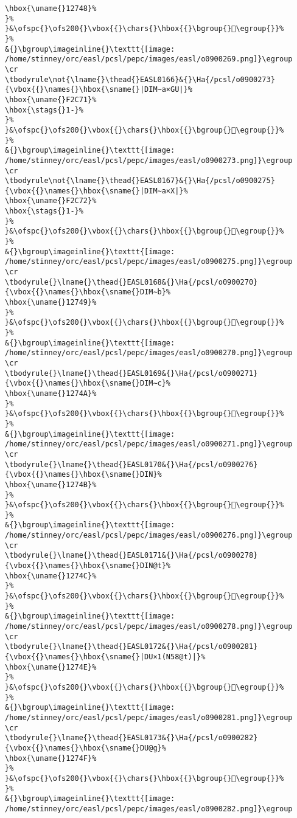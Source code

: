 \begin{verbatim}
\hbox{\uname{}12748}%
}%
}&\ofspc{}\ofs200{}\vbox{{}\chars{}\hbox{{}\bgroup{}𒝈\egroup{}}%
}%
&{}\bgroup\imageinline{}\texttt{[image: /home/stinney/orc/easl/pcsl/pepc/images/easl/o0900269.png]}\egroup
\cr
\tbodyrule\not{\lname{}\thead{}EASL0166}&{}\Ha{/pcsl/o0900273}{\vbox{{}\names{}\hbox{\sname{}|DIM∼a×GU|}%
\hbox{\uname{}F2C71}%
\hbox{\stags{}1-}%
}%
}&\ofspc{}\ofs200{}\vbox{{}\chars{}\hbox{{}\bgroup{}󲱱\egroup{}}%
}%
&{}\bgroup\imageinline{}\texttt{[image: /home/stinney/orc/easl/pcsl/pepc/images/easl/o0900273.png]}\egroup
\cr
\tbodyrule\not{\lname{}\thead{}EASL0167}&{}\Ha{/pcsl/o0900275}{\vbox{{}\names{}\hbox{\sname{}|DIM∼a×X|}%
\hbox{\uname{}F2C72}%
\hbox{\stags{}1-}%
}%
}&\ofspc{}\ofs200{}\vbox{{}\chars{}\hbox{{}\bgroup{}󲱲\egroup{}}%
}%
&{}\bgroup\imageinline{}\texttt{[image: /home/stinney/orc/easl/pcsl/pepc/images/easl/o0900275.png]}\egroup
\cr
\tbodyrule{}\lname{}\thead{}EASL0168&{}\Ha{/pcsl/o0900270}{\vbox{{}\names{}\hbox{\sname{}DIM∼b}%
\hbox{\uname{}12749}%
}%
}&\ofspc{}\ofs200{}\vbox{{}\chars{}\hbox{{}\bgroup{}𒝉\egroup{}}%
}%
&{}\bgroup\imageinline{}\texttt{[image: /home/stinney/orc/easl/pcsl/pepc/images/easl/o0900270.png]}\egroup
\cr
\tbodyrule{}\lname{}\thead{}EASL0169&{}\Ha{/pcsl/o0900271}{\vbox{{}\names{}\hbox{\sname{}DIM∼c}%
\hbox{\uname{}1274A}%
}%
}&\ofspc{}\ofs200{}\vbox{{}\chars{}\hbox{{}\bgroup{}𒝊\egroup{}}%
}%
&{}\bgroup\imageinline{}\texttt{[image: /home/stinney/orc/easl/pcsl/pepc/images/easl/o0900271.png]}\egroup
\cr
\tbodyrule{}\lname{}\thead{}EASL0170&{}\Ha{/pcsl/o0900276}{\vbox{{}\names{}\hbox{\sname{}DIN}%
\hbox{\uname{}1274B}%
}%
}&\ofspc{}\ofs200{}\vbox{{}\chars{}\hbox{{}\bgroup{}𒝋\egroup{}}%
}%
&{}\bgroup\imageinline{}\texttt{[image: /home/stinney/orc/easl/pcsl/pepc/images/easl/o0900276.png]}\egroup
\cr
\tbodyrule{}\lname{}\thead{}EASL0171&{}\Ha{/pcsl/o0900278}{\vbox{{}\names{}\hbox{\sname{}DIN@t}%
\hbox{\uname{}1274C}%
}%
}&\ofspc{}\ofs200{}\vbox{{}\chars{}\hbox{{}\bgroup{}𒝌\egroup{}}%
}%
&{}\bgroup\imageinline{}\texttt{[image: /home/stinney/orc/easl/pcsl/pepc/images/easl/o0900278.png]}\egroup
\cr
\tbodyrule{}\lname{}\thead{}EASL0172&{}\Ha{/pcsl/o0900281}{\vbox{{}\names{}\hbox{\sname{}|DU×1(N58@t)|}%
\hbox{\uname{}1274E}%
}%
}&\ofspc{}\ofs200{}\vbox{{}\chars{}\hbox{{}\bgroup{}𒝎\egroup{}}%
}%
&{}\bgroup\imageinline{}\texttt{[image: /home/stinney/orc/easl/pcsl/pepc/images/easl/o0900281.png]}\egroup
\cr
\tbodyrule{}\lname{}\thead{}EASL0173&{}\Ha{/pcsl/o0900282}{\vbox{{}\names{}\hbox{\sname{}DU@g}%
\hbox{\uname{}1274F}%
}%
}&\ofspc{}\ofs200{}\vbox{{}\chars{}\hbox{{}\bgroup{}𒝏\egroup{}}%
}%
&{}\bgroup\imageinline{}\texttt{[image: /home/stinney/orc/easl/pcsl/pepc/images/easl/o0900282.png]}\egroup

\end{verbatim}
